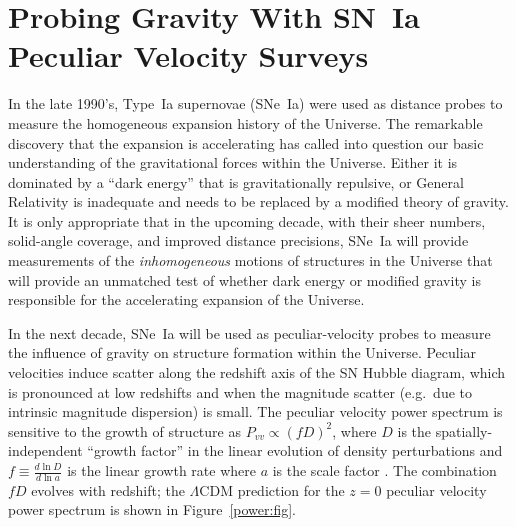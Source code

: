 \section{Probing Gravity With SN~Ia  Peculiar Velocity Surveys}
In the late 1990's, Type~Ia supernovae (SNe~Ia) were used as distance probes to measure the homogeneous expansion history of the Universe.  The remarkable discovery
that the expansion is accelerating  has called into question our basic understanding of the gravitational forces within the Universe.  Either it
is dominated by a ``dark energy'' that is gravitationally repulsive, or General Relativity is inadequate and needs to be replaced by a modified theory of
gravity.  It is only appropriate that in the upcoming decade, with their sheer numbers, solid-angle coverage,
and improved distance precisions, SNe~Ia will provide measurements of the {\it inhomogeneous} motions of structures in the Universe
that will provide an unmatched test of whether dark energy or modified gravity is responsible for the accelerating expansion of the Universe.

In the next decade, SNe~Ia will be used as peculiar-velocity probes to measure  the influence of gravity on structure formation within the Universe.
Peculiar velocities induce scatter along the redshift axis of the SN Hubble diagram, which is
pronounced at low redshifts and when the magnitude scatter (e.g.\ due to intrinsic magnitude dispersion) is small.
The peculiar velocity power spectrum is sensitive to the growth of structure as $P_{vv}\propto (fD)^2$, where $D$ is  the spatially-independent
``growth factor'' in the linear evolution of density perturbations and
$f \equiv \frac{d\ln{D}}{d\ln{a}}$ is the linear growth rate where $a$ is the scale factor  \citep{2006PhRvD..73l3526H,2011ApJ...741...67D}.
The combination $fD$ evolves with redshift;
the $\Lambda$CDM prediction for the $z=0$ peculiar velocity power spectrum is shown in Figure~\ref{power:fig}.

